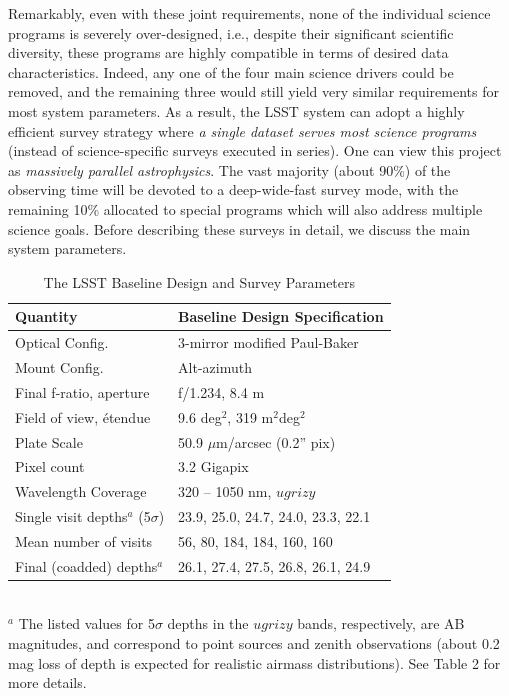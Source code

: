 \documentclass{emulateapj}
\begin{document}
Remarkably, even with these joint requirements, none of the 
individual science programs is severely over-designed, i.e., despite 
their significant scientific diversity, these programs are highly 
compatible in terms of desired data characteristics. Indeed, any one
of the four main science drivers could be removed, and the remaining 
three would still yield very similar requirements for most system 
parameters. As a result, the LSST system can adopt a highly 
efficient survey strategy where {\it a single dataset serves most science
programs} (instead of science-specific surveys executed in series). 
One can view this project as {\it massively parallel astrophysics}.
The vast majority (about 90\%) of the observing time will be devoted to 
a deep-wide-fast survey mode, with the remaining 10\% 
allocated to special programs which will also address multiple science 
goals. Before describing these surveys in detail, we discuss the main 
system parameters. 


\begin{table}
\caption{The LSST Baseline Design and Survey Parameters}
\begin{tabular}{|l|l|}
\hline  
   Quantity                         &     Baseline Design Specification    \\
\hline  
Optical Config.                     &  3-mirror modified Paul-Baker        \\
Mount Config.                       &  Alt-azimuth          \\
Final f-ratio, aperture             &  f/1.234, 8.4 m                \\
Field of view, \'etendue            &  9.6 deg$^2$,   319 m$^2$deg$^2$     \\
Plate Scale                         &  50.9 $\mu$m/arcsec (0.2'' pix)  \\
Pixel count                         &  3.2 Gigapix  \\
Wavelength Coverage                 &  320 -- 1050 nm, $ugrizy$                        \\
Single visit depths$^a$ (5$\sigma$) &  23.9, 25.0, 24.7, 24.0, 23.3, 22.1  \\
Mean number of visits               &  56, 80, 184, 184, 160, 160  \\ 
Final (coadded) depths$^a$          &  26.1, 27.4, 27.5, 26.8, 26.1, 24.9 \\
\hline                         
\end{tabular}
\\ \vskip 0.05in
$^a$ The listed values for 5$\sigma$ depths in the $ugrizy$ bands, respectively, 
are AB magnitudes, and correspond to point sources and zenith observations
(about 0.2 mag loss of depth is expected for realistic airmass distributions). 
See Table 2 for more details.   
\vskip 0.2in          
\end{table}
\end{document}
